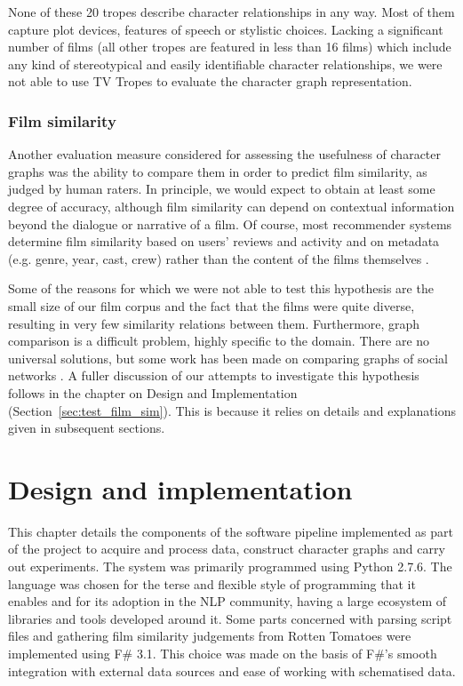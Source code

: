 \documentclass[bsc,frontabs,singlespacing,parskip, twoside]{infthesis}
\begin{document}
None of these 20 tropes describe character relationships in any way. Most of them capture plot devices, features of speech or stylistic choices. Lacking a significant number of films (all other tropes are featured in less than 16 films) which include any kind of stereotypical and easily identifiable character relationships, we were not able to use TV Tropes to evaluate the character graph representation.

\subsection{Film similarity}
\label{sec:hyp_film_sim}
Another evaluation measure considered for assessing the usefulness of character graphs was the ability to compare them in order to predict film similarity, as judged by human raters. In principle, we would expect to obtain at least some degree of accuracy, although film similarity can depend on contextual information beyond the dialogue or narrative of a film. Of course, most recommender systems determine film similarity based on users' reviews and activity and on metadata (e.g. genre, year, cast, crew) rather than the content of the films themselves \cite{said2010putting}.

Some of the reasons for which we were not able to test this hypothesis are the small size of our film corpus and the fact that the films were quite diverse, resulting in very few similarity relations between them. Furthermore, graph comparison is a difficult problem, highly specific to the domain. There are no universal solutions, but some work has been made on comparing graphs of social networks \cite{macindoe2010graph}. A fuller discussion of our attempts to investigate this hypothesis follows in the chapter on Design and Implementation (Section~\ref{sec:test_film_sim}). This is because it relies on details and explanations given in subsequent sections.

\chapter{Design and implementation}
\label{chap:design}
This chapter details the components of the software pipeline implemented as part of the project to acquire and process data, construct character graphs and carry out experiments. The system was primarily programmed using Python 2.7.6. The language was chosen for the terse and flexible style of programming that it enables and for its adoption in the NLP community, having a large ecosystem of libraries and tools developed around it. Some parts concerned with parsing script files and gathering film similarity judgements from Rotten Tomatoes were implemented using F\# 3.1. This choice was made on the basis of F\#'s smooth integration with external data sources and ease of working with schematised data.
\end{document}
